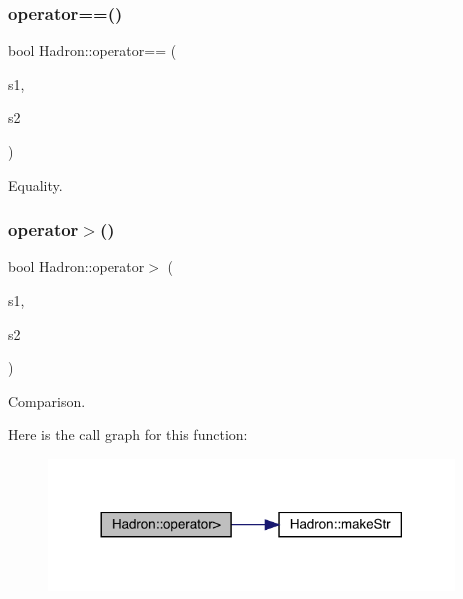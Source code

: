 \subsubsection{\texorpdfstring{operator==()}{operator==()}\hspace{0.1cm}{\footnotesize\ttfamily [5/5]}}
{\footnotesize\ttfamily bool Hadron\+::operator== (\begin{DoxyParamCaption}\item[{const \mbox{\hyperlink{structHadron_1_1HadronDiagramTimeSlices__t}{Hadron\+Diagram\+Time\+Slices\+\_\+t}} \&}]{s1,  }\item[{const \mbox{\hyperlink{structHadron_1_1HadronDiagramTimeSlices__t}{Hadron\+Diagram\+Time\+Slices\+\_\+t}} \&}]{s2 }\end{DoxyParamCaption})}



Equality. 

\mbox{\label{namespaceHadron_a341b896434c5621c127ef5066c50c7f0}} 
\subsubsection{\texorpdfstring{operator$>$()}{operator>()}}
{\footnotesize\ttfamily bool Hadron\+::operator$>$ (\begin{DoxyParamCaption}\item[{const \mbox{\hyperlink{structHadron_1_1HadronVertex__t}{Hadron\+Vertex\+\_\+t}} \&}]{s1,  }\item[{const \mbox{\hyperlink{structHadron_1_1HadronVertex__t}{Hadron\+Vertex\+\_\+t}} \&}]{s2 }\end{DoxyParamCaption})}



Comparison. 

Here is the call graph for this function\+:\nopagebreak
\begin{figure}[H]
\begin{center}
\leavevmode
\includegraphics[width=305pt]{d1/daf/namespaceHadron_a341b896434c5621c127ef5066c50c7f0_cgraph}
\end{center}
\end{figure}
\mbox{\label{namespaceHadron_a8f8a77c02a6415ffc31d2a300f59e6a6}} 
